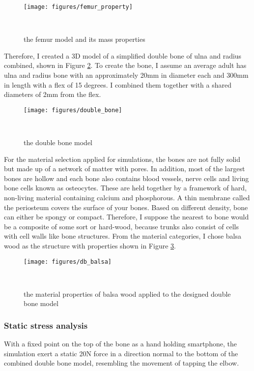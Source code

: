 \documentclass{sigchi}
\begin{document}
\begin{figure}
\centering
  \texttt{[image: figures/femur\_property]}
  \caption{the femur model and its mass properties }~\label{fig:femur_property}
\end{figure}


Therefore, I created a 3D model of a simplified double bone of ulna and radius combined, shown in Figure \ref{fig:double_bone}. To create the bone, I assume an average adult has ulna and radius bone with an approximately 20mm in diameter each and 300mm in length with a flex of 15 degrees. I combined them together with a shared diameters of 2mm from the flex. 


\begin{figure}
\centering
  \texttt{[image: figures/double\_bone]}
  \caption{the double bone model}~\label{fig:double_bone}
\end{figure}


For the material selection applied for simulations, the bones are not fully solid but made up of a network of matter with pores. In addition, most of the largest bones are hollow and each bone also contains blood vessels, nerve cells and living bone cells known as osteocytes. These are held together by a framework of hard, non-living material containing calcium and phosphorous. A thin membrane called the periosteum covers the surface of your bones. Based on different density, bone can either be spongy or compact. Therefore, I suppose the nearest to bone would be a composite of some sort or hard-wood, because trunks also consist of cells with cell walls like bone structures. From the material categories, I chose balsa wood as the structure with properties shown in Figure \ref{fig:db_balsa}.

\begin{figure}
\centering
  \texttt{[image: figures/db\_balsa]}
  \caption{the material properties of balsa wood applied to the designed double bone model}~\label{fig:db_balsa}
\end{figure}

\subsubsection{Static stress analysis}

With a fixed point on the top of the bone as a hand holding smartphone, the simulation exert a static 20N force in a direction normal to the bottom of the combined double bone model, resembling the movement of tapping the elbow.
\end{document}
